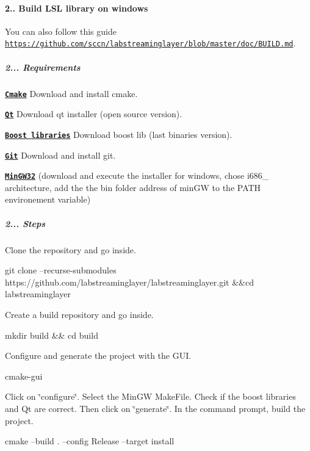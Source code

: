 \paragraph*{2.. Build L\+SL library on windows}

You can also follow this guide \href{https://github.com/sccn/labstreaminglayer/blob/master/doc/BUILD.md}{\tt https\+://github.\+com/sccn/labstreaminglayer/blob/master/doc/\+B\+U\+I\+L\+D.\+md}. \subparagraph*{2... {\bfseries Requirements}}


\begin{DoxyItemize}
\item \href{https://cmake.org/download/}{\tt {\bfseries Cmake}} Download and install cmake.
\item \href{https://www.qt.io/download}{\tt {\bfseries Qt}} Download qt installer (open source version).
\item \href{https://sourceforge.net/projects/boost/files/boost-binaries/}{\tt {\bfseries Boost libraries}} Download boost lib (last binaries version).
\item \href{https://git-for-windows.github.io/}{\tt {\bfseries Git}} Download and install git.
\item \href{https://sourceforge.net/projects/mingw-w64/}{\tt {\bfseries Min\+G\+W32}} (download and execute the installer for windows, chose i686\+\_ architecture, add the the bin folder address of min\+GW to the P\+A\+TH environement variable)
\end{DoxyItemize}

\subparagraph*{2... Steps}


\begin{DoxyItemize}
\item Clone the repository and go inside. 
\begin{DoxyCode}
git clone --recurse-submodules https://github.com/labstreaminglayer/labstreaminglayer.git &&cd
       labstreaminglayer
\end{DoxyCode}

\item Create a build repository and go inside. 
\begin{DoxyCode}
mkdir build && cd build
\end{DoxyCode}
 Configure and generate the project with the G\+UI. 
\begin{DoxyCode}
cmake-gui
\end{DoxyCode}
 Click on \char`\"{}configure\char`\"{}. Select the Min\+GW Make\+File. Check if the boost libraries and Qt are correct. Then click on \char`\"{}generate\char`\"{}. In the command prompt, build the project. 
\begin{DoxyCode}
cmake --build . --config Release --target install
\end{DoxyCode}
 
\end{DoxyItemize}